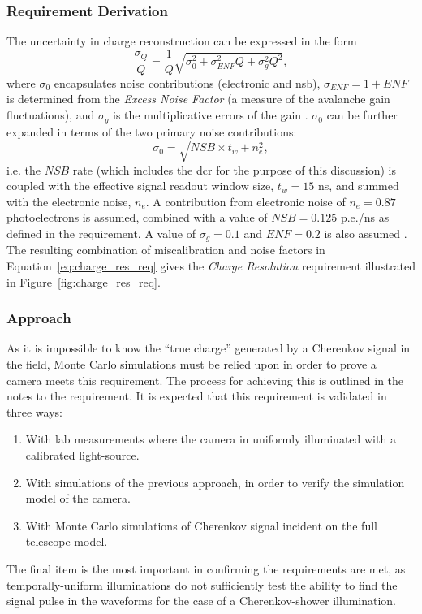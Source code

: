 \subsubsection{Requirement Derivation}
The uncertainty in charge reconstruction can be expressed in the form
\begin{equation} \label{eq:charge_res_req}
\dfrac{\sigma_Q}{Q} = \dfrac{1}{Q} \sqrt{\sigma_0^2 + \sigma_{ENF}^2 Q + \sigma_g^2 Q^2},
\end{equation}
where $\sigma_0$ encapsulates noise contributions (electronic and \gls{nsb}), $\sigma_{ENF} = 1 + \mathit{ENF}$ is determined from the \textit{Excess Noise Factor} (a measure of the avalanche gain fluctuations), and $\sigma_g$ is the multiplicative errors of the gain \cite{petophotons}\cite{Ohm2012}. $\sigma_0$ can be further expanded in terms of the two primary noise contributions:
\begin{equation} \label{eq:charge_res_nsb}
\sigma_0 = \sqrt{\mathit{NSB} \times t_w + n_e^2},
\end{equation}
i.e. the $\mathit{NSB}$ rate (which includes the \gls{dcr} for the purpose of this discussion) is coupled with the effective signal readout window size, $t_w = 15$ ns, and summed with the electronic noise, $n_e$. A contribution from electronic noise of $n_e = 0.87$ photoelectrons is assumed, combined with a value of $\mathit{NSB} = 0.125$ p.e./ns as defined in the requirement. A value of $\sigma_g = 0.1$ and $\mathit{ENF} = 0.2$ is also assumed \cite{petophotons}. The resulting combination of miscalibration and noise factors in Equation~\ref{eq:charge_res_req} gives the \textit{Charge Resolution} requirement illustrated in Figure~\ref{fig:charge_res_req}.

\subsubsection{Approach}
As it is impossible to know the ``true charge'' generated by a Cherenkov signal in the field, Monte Carlo simulations must be relied upon in order to prove a camera meets this requirement. The process for achieving this is outlined in the notes to the requirement. It is expected that this requirement is validated in three ways:
\begin{enumerate}
\item With lab measurements where the camera in uniformly illuminated with a calibrated light-source.
\item With simulations of the previous approach, in order to verify the simulation model of the camera.
\item With Monte Carlo simulations of Cherenkov signal incident on the full telescope model.
\end{enumerate}
The final item is the most important in confirming the requirements are met, as temporally-uniform illuminations do not sufficiently test the ability to find the signal pulse in the waveforms for the case of a Cherenkov-shower illumination. 

